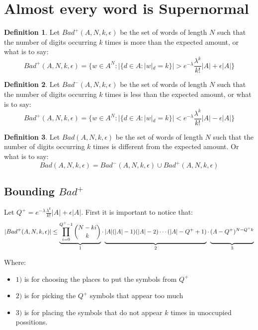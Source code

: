 \documentclass[10pt, a4paper]{article}
\theoremstyle{definition}
\newtheorem{definition}{Definition}[section]
\begin{document}
\section{Almost every word is Supernormal}


\begin{definition}
  Let $Bad^+(A,N,k,\epsilon)$ be the set of words of length $N$ such that the number of digits occurring $k$ times is more than the expected amount, or what is to say:
  $$Bad^+(A,N,k,\epsilon) = \{w \in A^{N}: |\{d \in A: |w|_d = k\}|> e^{-\lambda}\frac{\lambda^{k}}{k!}|A| + \epsilon|A|\}$$
\end{definition}

\begin{definition}
  Let $Bad^-(A,N,k,\epsilon)$ be the set of words of length $N$ such that the number of digits occurring $k$ times is less than the expected amount, or what is to say:
  $$Bad^+(A,N,k,\epsilon) = \{w \in A^{N}: |\{d \in A: |w|_d = k\}|< e^{-\lambda}\frac{\lambda^{k}}{k!}|A| - \epsilon|A|\}$$
\end{definition}

\begin{definition}
  Let $Bad(A,N,k,\epsilon)$ be the set of words of length $N$ such that the number of digits occurring $k$ times is different from the expected amount. Or what is to say:
  $$Bad(A,N,k,\epsilon) = Bad^-(A,N,k,\epsilon) \cup Bad^+(A,N,k,\epsilon)$$
\end{definition}


\subsection{Bounding $Bad^+$}
Let $Q^+ = e^{-\lambda}\frac{\lambda^{k}}{k!}|A| + \epsilon|A|$.
First it is important to notice that:
$$|Bad^+(A,N,k,\epsilon)| \leq  \underbrace{\prod_{i=0}^{Q^+ -1} \binom{N-ki}{k}}_{1} \cdot \underbrace{\vphantom{ \prod_{i=0}^{j-1 }} |A|(|A| - 1)(|A| - 2)\cdots(|A| - Q^+ + 1)}_{2}    \cdot \underbrace{ \vphantom{ \prod_{i=0}^{j-1 }} (A-Q^+)^{N-Q^+k}}_{3} $$

Where:
\begin{itemize}
  \item $1)$ is for choosing the places to put the symbols from $Q^+$
  \item $2)$ is for picking the $Q^+$ symbols that appear too much
  \item $3)$ is for placing the symbols that do not appear $k$ times in unoccupied possitions.
\end{itemize}
\end{document}
